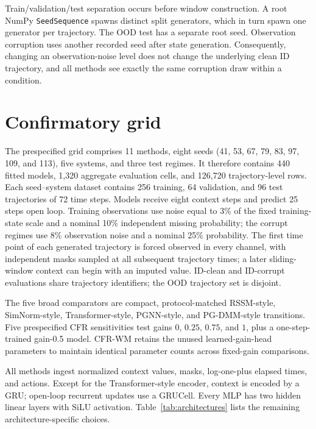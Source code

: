 \documentclass[pdflatex,sn-basic]{sn-jnl}
\begin{document}
\begin{appendices}
Train/validation/test separation occurs before window construction. A root NumPy \texttt{SeedSequence} spawns distinct split generators, which in turn spawn one generator per trajectory. The OOD test has a separate root seed. Observation corruption uses another recorded seed after state generation. Consequently, changing an observation-noise level does not change the underlying clean ID trajectory, and all methods see exactly the same corruption draw within a condition.

\section{Confirmatory grid}

The prespecified grid comprises 11 methods, eight seeds (41, 53, 67, 79, 83, 97, 109, and 113), five systems, and three test regimes. It therefore contains 440 fitted models, 1,320 aggregate evaluation cells, and 126,720 trajectory-level rows. Each seed--system dataset contains 256 training, 64 validation, and 96 test trajectories of 72 time steps. Models receive eight context steps and predict 25 steps open loop. Training observations use noise equal to 3\% of the fixed training-state scale and a nominal 10\% independent missing probability; the corrupt regimes use 8\% observation noise and a nominal 25\% probability. The first time point of each generated trajectory is forced observed in every channel, with independent masks sampled at all subsequent trajectory times; a later sliding-window context can begin with an imputed value. ID-clean and ID-corrupt evaluations share trajectory identifiers; the OOD trajectory set is disjoint.

The five broad comparators are compact, protocol-matched RSSM-style,
SimNorm-style, Transformer-style, PGNN-style, and PG-DMM-style transitions. Five
prespecified CFR sensitivities test gains $0$, $0.25$, $0.75$, and $1$, plus a
one-step-trained gain-0.5 model. CFR-WM retains the unused learned-gain-head
parameters to maintain identical parameter counts across fixed-gain comparisons.

All methods ingest normalized context values, masks, log-one-plus elapsed times,
and actions. Except for the Transformer-style encoder, context is encoded by a
GRU; open-loop recurrent updates use a GRUCell. Every MLP has two hidden linear
layers with SiLU activation. Table~\ref{tab:architectures} lists the remaining
architecture-specific choices.


\end{appendices}
\end{document}
